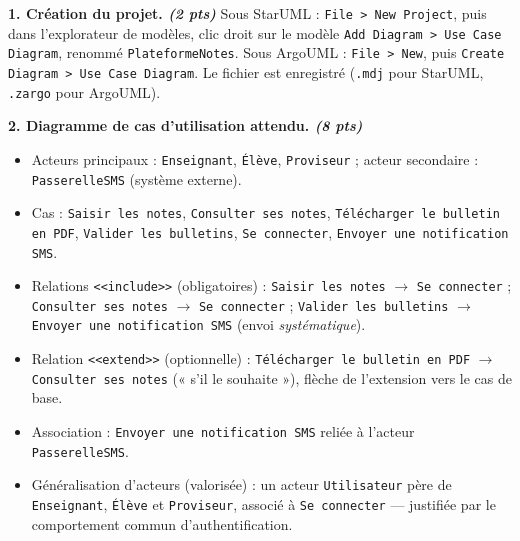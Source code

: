 \documentclass[11pt]{article}
\begin{document}
\begin{corrige}
\textbf{1. Création du projet. \emph{(2 pts)}} Sous StarUML : \texttt{File > New Project}, puis dans l'explorateur de modèles, clic droit sur le modèle \texttt{Add Diagram > Use Case Diagram}, renommé \texttt{PlateformeNotes}. Sous ArgoUML : \texttt{File > New}, puis \texttt{Create Diagram > Use Case Diagram}. Le fichier est enregistré (\texttt{.mdj} pour StarUML, \texttt{.zargo} pour ArgoUML).

\textbf{2. Diagramme de cas d'utilisation attendu. \emph{(8 pts)}}
\begin{itemize}
\item Acteurs principaux : \texttt{Enseignant}, \texttt{Élève}, \texttt{Proviseur} ; acteur secondaire : \texttt{PasserelleSMS} (système externe).
\item Cas : \texttt{Saisir les notes}, \texttt{Consulter ses notes}, \texttt{Télécharger le bulletin en PDF}, \texttt{Valider les bulletins}, \texttt{Se connecter}, \texttt{Envoyer une notification SMS}.
\item Relations \texttt{<<include>>} (obligatoires) : \texttt{Saisir les notes} $\to$ \texttt{Se connecter} ; \texttt{Consulter ses notes} $\to$ \texttt{Se connecter} ; \texttt{Valider les bulletins} $\to$ \texttt{Envoyer une notification SMS} (envoi \emph{systématique}).
\item Relation \texttt{<<extend>>} (optionnelle) : \texttt{Télécharger le bulletin en PDF} $\to$ \texttt{Consulter ses notes} (« s'il le souhaite »), flèche de l'extension vers le cas de base.
\item Association : \texttt{Envoyer une notification SMS} reliée à l'acteur \texttt{PasserelleSMS}.
\item Généralisation d'acteurs (valorisée) : un acteur \texttt{Utilisateur} père de \texttt{Enseignant}, \texttt{Élève} et \texttt{Proviseur}, associé à \texttt{Se connecter} — justifiée par le comportement commun d'authentification.
\end{itemize}
\end{corrige}
\end{document}
